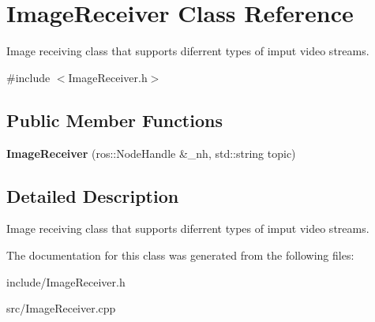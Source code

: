 \hypertarget{classImageReceiver}{}\section{Image\+Receiver Class Reference}
\label{classImageReceiver}


Image receiving class that supports diferrent types of imput video streams.  




{\ttfamily \#include $<$Image\+Receiver.\+h$>$}

\subsection*{Public Member Functions}
\begin{DoxyCompactItemize}
\item 
\mbox{\label{classImageReceiver_ae1356643b5d08041070aee58e2294a59}} 
{\bfseries Image\+Receiver} (ros\+::\+Node\+Handle \&\+\_\+nh, std\+::string topic)
\end{DoxyCompactItemize}


\subsection{Detailed Description}
Image receiving class that supports diferrent types of imput video streams. 

The documentation for this class was generated from the following files\+:\begin{DoxyCompactItemize}
\item 
include/Image\+Receiver.\+h\item 
src/Image\+Receiver.\+cpp\end{DoxyCompactItemize}
